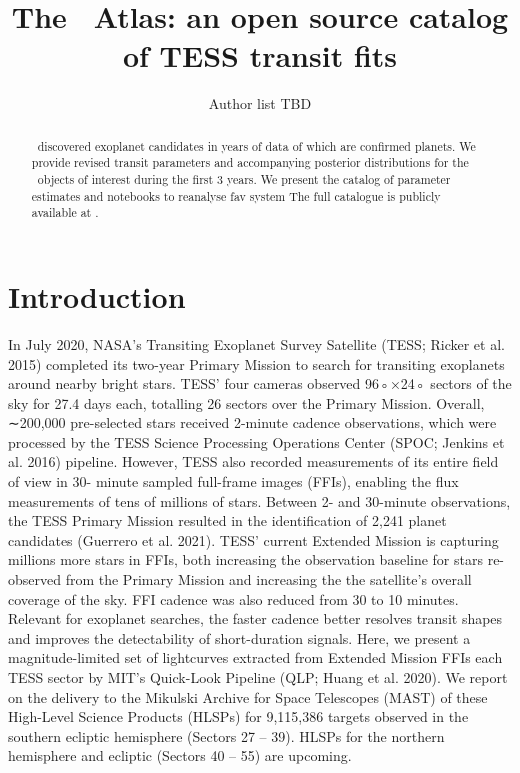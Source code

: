 \documentclass[modern]{aastex63}
\begin{document}
\title{The \tess\ Atlas: an open source catalog of TESS transit fits}


\author{Author list TBD}
% 


\begin{abstract}
\tess\ discovered  exoplanet candidates in  years of data of which  are confirmed planets.
We provide revised transit parameters and accompanying posterior distributions for the \tess\ objects of interest during the first 3 years.
We present the catalog of parameter estimates and notebooks to reanalyse fav system
The full catalogue is publicly available at .
\end{abstract}



\section{Introduction} \label{sec:intro}



In July 2020, NASA’s Transiting Exoplanet Survey Satellite (TESS; Ricker et al. 2015) completed its two-year
Primary Mission to search for transiting exoplanets around nearby bright stars. TESS’ four cameras observed 96◦×24◦
sectors of the sky for 27.4 days each, totalling 26 sectors over the Primary Mission. Overall, ∼200,000 pre-selected
stars received 2-minute cadence observations, which were processed by the TESS Science Processing Operations Center
(SPOC; Jenkins et al. 2016) pipeline. However, TESS also recorded measurements of its entire field of view in 30-
minute sampled full-frame images (FFIs), enabling the flux measurements of tens of millions of stars. Between 2- and
30-minute observations, the TESS Primary Mission resulted in the identification of 2,241 planet candidates (Guerrero
et al. 2021).
TESS’ current Extended Mission is capturing millions more stars in FFIs, both increasing the observation baseline
for stars re-observed from the Primary Mission and increasing the the satellite’s overall coverage of the sky. FFI
cadence was also reduced from 30 to 10 minutes. Relevant for exoplanet searches, the faster cadence better resolves
transit shapes and improves the detectability of short-duration signals. Here, we present a magnitude-limited set of
lightcurves extracted from Extended Mission FFIs each TESS sector by MIT’s Quick-Look Pipeline (QLP; Huang
et al. 2020). We report on the delivery to the Mikulski Archive for Space Telescopes (MAST) of these High-Level
Science Products (HLSPs) for 9,115,386 targets observed in the southern ecliptic hemisphere (Sectors 27 – 39). HLSPs
for the northern hemisphere and ecliptic (Sectors 40 – 55) are upcoming.
\end{document}
